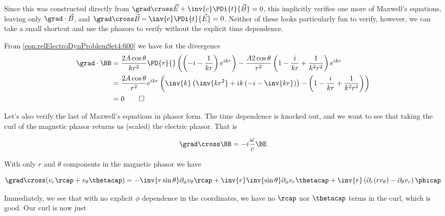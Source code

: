 Since this was constructed directly from $\grad \cross \vec{E} +\inv{c} \PDi{t}{\vec{B}} = 0$, this implicitly verifies one more of Maxwell's equations, leaving only $\grad \cdot \vec{B}$, and $\grad \cross \vec{B} -\inv{c} \PDi{t}{\vec{E}} = 0$.  Neither of these looks particularly fun to verify, however, we can take a small shortcut and use the phasors to verify without the explicit time dependence.

From \ref{eqn:relElectroDynProblemSet4:600} we have for the divergence
\begin{align*}
\grad \cdot \BB 
&=
\frac{2 A \cos\theta}{k r^2 } 
\PD{r}{} \left(
\left( -i - \frac{1}{kr} \right) e^{i k r} 
\right)
- \frac{A 2 \cos\theta}{r^2} \left( 1 - \frac{i}{k r} + \frac{1}{k^2 r^2} \right) e^{i k r}  \\
&=
\frac{2 A \cos\theta}{r^2 } e^{i k r}
\left(
\inv{k}\left( \inv{k r^2} + i k \left(-i - \inv{k r}\right)
\right)
-
\left( 1 - \frac{i}{k r} + \frac{1}{k^2 r^2} \right) 
\right) \\
&= 0 \qquad \square
\end{align*}

Let's also verify the last of Maxwell's equations in phasor form.  The time dependence is knocked out, and we want to see that taking the curl of the magnetic phasor returns us (scaled) the electric phasor.  That is

\begin{equation}\label{eqn:relElectroDynProblemSet4:620}
\grad \cross \BB = - i \frac{\omega}{c} \BE
\end{equation}

With only $r$ and $\theta$ components in the magnetic phasor we have

\begin{equation}\label{eqn:relElectroDynProblemSet4:630}
\grad \cross (v_r \rcap + v_\theta \thetacap) 
=
-\inv{r \sin\theta} 
\partial_\phi v_\theta
\rcap
+
\inv{r } 
\inv{\sin\theta} \partial_\phi v_r 
\thetacap
+
\inv{r } \left(
\partial_r (r v_\theta) - \partial_\theta v_r
\right) \phicap
\end{equation}

Immediately, we see that with no explicit $\phi$ dependence in the coordinates, we have no $\rcap$ nor $\thetacap$ terms in the curl, which is good.  Our curl is now just

